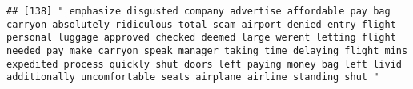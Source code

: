 \documentclass[
]{article}
\begin{document}
\begin{verbatim}
## [138] " emphasize disgusted company advertise affordable pay bag carryon absolutely ridiculous total scam airport denied entry flight personal luggage approved checked deemed large werent letting flight needed pay make carryon speak manager taking time delaying flight mins expedited process quickly shut doors left paying money bag left livid additionally uncomfortable seats airplane airline standing shut "                                                                                                                                                                                                                                                                                                                                                                                                                                                                                                                                                                                                                                                                                                                                                                                                                                                                                                                                                                                                                                                                                                                                                                                                                                                                                                                                                                             

\end{verbatim}
\end{document}
